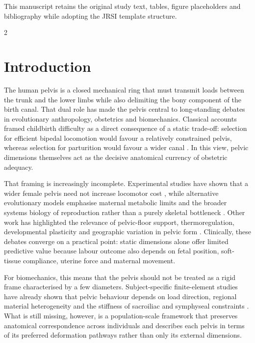 \documentclass[openacc]{rsproca_new}
\begin{document}
\begin{fmtext}
This manuscript retains the original study text, tables, figure placeholders and bibliography while adopting the JRSI template structure.
\end{fmtext}

\maketitle

\begin{multicols}{2}
\section{Introduction}

The human pelvis is a closed mechanical ring that must transmit loads between the trunk and the lower limbs while also delimiting the bony component of the birth canal. That dual role has made the pelvis central to long-standing debates in evolutionary anthropology, obstetrics and biomechanics. Classical accounts framed childbirth difficulty as a direct consequence of a static trade-off: selection for efficient bipedal locomotion would favour a relatively constrained pelvis, whereas selection for parturition would favour a wider canal \cite{RosenbergTrevathan2002,Trevathan2015,Grunstra2023}. In this view, pelvic dimensions themselves act as the decisive anatomical currency of obstetric adequacy.

That framing is increasingly incomplete. Experimental studies have shown that a wider female pelvis need not increase locomotor cost \cite{Warrener2015}, while alternative evolutionary models emphasise maternal metabolic limits and the broader systems biology of reproduction rather than a purely skeletal bottleneck \cite{Dunsworth2012}. Other work has highlighted the relevance of pelvic-floor support, thermoregulation, developmental plasticity and geographic variation in pelvic form \cite{Pavlicev2020,BettiManica2018,Novak2020}. Clinically, these debates converge on a practical point: static dimensions alone offer limited predictive value because labour outcome also depends on fetal position, soft-tissue compliance, uterine force and maternal movement.

For biomechanics, this means that the pelvis should not be treated as a rigid frame characterised by a few diameters. Subject-specific finite-element studies have already shown that pelvic behaviour depends on load direction, regional material heterogeneity and the stiffness of sacroiliac and symphyseal constraints \cite{Eichenseer2011,Hammer2013}. What is still missing, however, is a population-scale framework that preserves anatomical correspondence across individuals and describes each pelvis in terms of its preferred deformation pathways rather than only its external dimensions.


\end{multicols}
\end{document}
